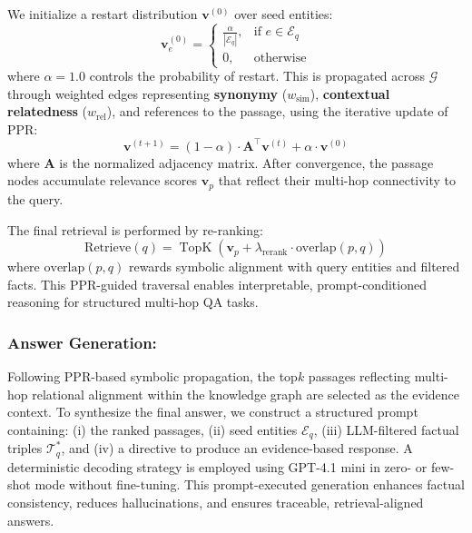 \documentclass[runningheads]{llncs}
\begin{document}
We initialize a restart distribution $\mathbf{v}^{(0)}$ over seed entities:
\begin{equation}
\mathbf{v}_e^{(0)} = 
\begin{cases}
    \frac{\alpha}{|\mathcal{E}_q|}, & \text{if } e \in \mathcal{E}_q \\
    0, & \text{otherwise}
\end{cases}
\end{equation}
where $\alpha = 1.0$ controls the probability of restart. This is propagated across $\mathcal{G}$ through weighted edges representing \textbf{synonymy} ($w_\mathrm{sim}$), \textbf{contextual relatedness} ($w_\mathrm{rel}$), and references to the passage, using the iterative update of PPR:
\begin{equation}
\mathbf{v}^{(t+1)} = (1 - \alpha) \cdot \mathbf{A}^\top \mathbf{v}^{(t)} + \alpha \cdot \mathbf{v}^{(0)}
\end{equation}
where $\mathbf{A}$ is the normalized adjacency matrix. After convergence, the passage nodes accumulate relevance scores $\mathbf{v}_p$ that reflect their multi-hop connectivity to the query.

The final retrieval is performed by re-ranking:
\begin{equation}
\text{Retrieve}(q) = \operatorname{TopK}\left(\mathbf{v}_p + \lambda_\mathrm{rerank} \cdot \text{overlap}(p, q)\right)
\end{equation}
where $\text{overlap}(p, q)$ rewards symbolic alignment with query entities and filtered facts. This PPR-guided traversal enables interpretable, prompt-conditioned reasoning for structured multi-hop QA tasks.

\subsubsection{Answer Generation:}
\noindent
Following PPR-based symbolic propagation, the top$k$ passages reflecting multi-hop relational alignment within the knowledge graph are selected as the evidence context. To synthesize the final answer, we construct a structured prompt containing: (i) the ranked passages, (ii) seed entities $\mathcal{E}_q$, (iii) LLM-filtered factual triples $\mathcal{T}_q^*$, and (iv) a directive to produce an evidence-based response. A deterministic decoding strategy is employed using GPT-4.1 mini in zero- or few-shot mode without fine-tuning. This prompt-executed generation enhances factual consistency, reduces hallucinations, and ensures traceable, retrieval-aligned answers.
\end{document}
